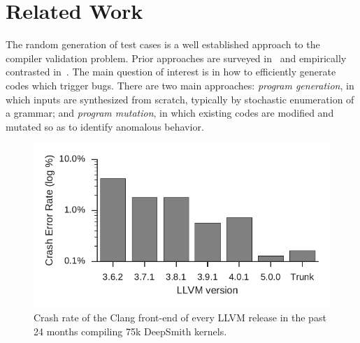 \section{Related Work}\label{sec:rw}



The random generation of test cases is a well established approach to the compiler validation problem. Prior approaches are surveyed in~\cite{Kossatchev2005,Boujarwah1997} and empirically contrasted in~\cite{Chen2014a}. The main question of interest is in how to efficiently generate codes which trigger bugs. There are two main approaches: \emph{program generation}, in which inputs are synthesized from scratch, typically by stochastic enumeration of a grammar; and \emph{program mutation}, in which existing codes are modified and mutated so as to identify anomalous behavior.

\begin{figure}
	\centering %
	\includegraphics[width=.95\columnwidth]{build/img/clang-crashes}%
	\caption{%
		Crash rate of the Clang front-end of every LLVM release in the past 24 months compiling 75k DeepSmith kernels.
	}%
  \vspace{-0.8em}
	\label{fig:clangs} %
\end{figure}
\begin{table}
	\footnotesize %
	\centering %
	
	\caption{%
		The number of DeepSmith programs which trigger distinct Clang front-end assertions, and the number of programs which trigger unreachables.%
	}
  \vspace{-2.1em}
	\label{tab:clangs}
\end{table}

